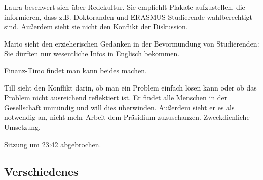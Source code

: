 \documentclass[ngerman,headheight=70pt]{scrartcl}
\begin{document}
    Laura beschwert sich über Redekultur. Sie empfiehlt Plakate aufzustellen,
    die informieren, dass z.B. Doktoranden und ERASMUS-Studierende wahlberechtigt
    sind. Außerdem sieht sie nicht den Konflikt der Diskussion.

    Mario sieht den erzieherischen Gedanken in der Bevormundung von Studierenden:
    Sie dürften nur wesentliche Infos in Englisch bekommen.

    Finanz-Timo findet man kann beides machen.

    Till sieht den Konflikt darin, ob man ein Problem einfach lösen kann oder
    ob das Problem nicht ausreichend reflektiert ist. Er findet alle Menschen
    in der Gesellschaft unmündig und will dies überwinden. Außerdem sieht er
    es als notwendig an, nicht mehr Arbeit dem Präsidium zuzuschanzen. Zweckdienliche
    Umsetzung.

    Sitzung um 23:42 abgebrochen.


    \subsection{Verschiedenes}
\end{document}
